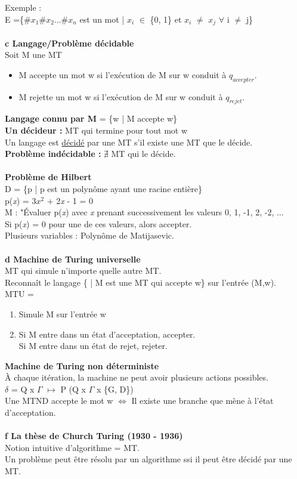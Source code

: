 \documentclass[12pt,a4paper]{article}
\newcommand\tab[1][0.65cm]{\hspace*{#1}}
\begin{document}
Exemple :\\
E =\{\#$x_1$\#$x_2$...\#$x_n$ est un mot | $x_i$ $\in$ \{0, 1\} et $x_i$ $\neq$ $x_j$ $\forall$ i $\neq$ j\}\\\\
\textbf{c Langage/Problème décidable\\}
Soit M une MT
\begin{itemize}
	\item M accepte un mot w si l'exécution de M sur w conduit à $q_{accepter}$.
	\item M rejette un mot w si l'exécution de M sur w conduit à $q_{rejet}$.\\
\end{itemize}
\textbf{Langage connu par M }= \{w | M accepte w\}\\
\textbf{Un décideur : }MT qui termine pour tout mot w\\
Un langage est \underline{décidé} par une MT s'il existe une MT que le décide.\\
\textbf{Problème indécidable : } $\nexists$ MT qui le décide.\\\\
\textbf{\large Problème de Hilbert}\\
D = \{p | p est un polynôme ayant une racine entière\}\\
p(\textit{x}) = 3$x^2$ + 2\textit{x} - 1 = 0\\
M : "Évaluer p(\textit{x}) avec \textit{x} prenant successivement les valeurs 0, 1, -1, 2, -2, ...\\
Si p(\textit{x}) = 0 pour une de ces valeurs, alors accepter.\\
Plusieurs variables : Polynôme de Matijasevic.\\\\
\textbf{d Machine de Turing universelle\\}
MT qui simule n'importe quelle autre MT.\\
Reconnaît le langage \{<M,w> | M est une MT qui accepte w\} sur l'entrée (M,w).\\
MTU =
\begin{enumerate}
	\item Simule M sur l'entrée w
	\item Si M entre dans un état d'acceptation, accepter.\\Si M entre dans un état de rejet, rejeter.
\end{enumerate}
\textbf{Machine de Turing non déterministe}\\
À chaque itération, la machine ne peut avoir plusieurs actions possibles.\\
\tab $\delta$ = Q x $\Gamma$ $\longmapsto$ P (Q x $\Gamma$ x \{G, D\})\\
Une MTND accepte le mot w $\Leftrightarrow$ Il existe une branche que mène à l'état d'acceptation.\\\\
\textbf{f La thèse de Church Turing (1930 - 1936)}\\
Notion intuitive d'algorithme = MT.\\
Un problème peut être résolu par un algorithme ssi il peut être décidé par une MT.
\end{document}
